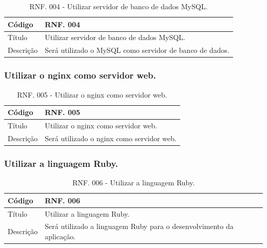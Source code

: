 \documentclass[11pt]{article}
\begin{document}
        \begin{table}[h]
          \begin{center}
            \begin{tabular}{ | p{5cm} | p{10cm} | }
              \hline
              Código\cellcolor{gray} & RNF. 004\cellcolor{gray} \\
              \hline
              Título & Utilizar servidor de banco de dados MySQL. \\
              \hline
              Descrição & Será utilizado o MySQL como servidor de banco de dados. \\
              \hline
            \end{tabular}
            \caption{RNF. 004 - Utilizar servidor de banco de dados MySQL.}
          \end{center}
        \end{table}

      \subsubsection{Utilizar o nginx como servidor web.}

        \begin{table}[h]
          \begin{center}
            \begin{tabular}{ | p{5cm} | p{10cm} | }
              \hline
              Código\cellcolor{gray} & RNF. 005\cellcolor{gray} \\
              \hline
              Título & Utilizar o nginx como servidor web. \\
              \hline
              Descrição & Será utilizado o nginx como servidor web. \\
              \hline
            \end{tabular}
            \caption{RNF. 005 - Utilizar o nginx como servidor web.}
          \end{center}
        \end{table}

    \clearpage

      \subsubsection{Utilizar a linguagem Ruby.}

        \begin{table}[h]
          \begin{center}
            \begin{tabular}{ | p{5cm} | p{10cm} | }
              \hline
              Código\cellcolor{gray} & RNF. 006\cellcolor{gray} \\
              \hline
              Título & Utilizar a linguagem Ruby. \\
              \hline
              Descrição & Será utilizado a linguagem Ruby para o desenvolvimento da aplicação. \\
              \hline
            \end{tabular}
            \caption{RNF. 006 - Utilizar a linguagem Ruby.}
          \end{center}
        \end{table}
        
\end{document}
